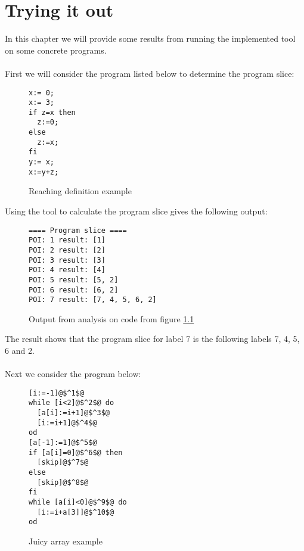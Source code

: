 \chapter{Trying it out}
In this chapter we will provide some results from running the implemented tool on some concrete programs.
\\\\
First we will consider the program listed below to determine the program slice:

\begin{figure}[H]
  \begin{lstlisting}
x:= 0;
x:= 3;
if z=x then 
  z:=0;
else
  z:=x;
fi
y:= x;
x:=y+z;
 \end{lstlisting}
 \caption{Reaching definition example}
\label{code:RD_test_example}
\end{figure}
Using the tool to calculate the program slice gives the following output:

\begin{figure}[H]
  \begin{lstlisting}[numbers=none]
==== Program slice ====
POI: 1 result: [1]
POI: 2 result: [2]
POI: 3 result: [3]
POI: 4 result: [4]
POI: 5 result: [5, 2]
POI: 6 result: [6, 2]
POI: 7 result: [7, 4, 5, 6, 2]
\end{lstlisting}
\caption{Output from analysis on code from figure \ref{code:RD_test_example}}
\label{code:RD_test_example_output}
\end{figure}
The result shows that the program slice for label 7 is the following labels 7, 4, 5, 6 and 2.
\\\\
Next we consider the program below:

\begin{figure}[H]
  \begin{lstlisting}
[i:=-1]@$^1$@
while [i<2]@$^2$@ do
  [a[i]:=i+1]@$^3$@
  [i:=i+1]@$^4$@
od
[a[-1]:=1]@$^5$@
if [a[i]=0]@$^6$@ then
  [skip]@$^7$@
else
  [skip]@$^8$@
fi
while [a[i]<0]@$^9$@ do
  [i:=i+a[3]]@$^10$@
od
 \end{lstlisting}
 \caption{Juicy array example}
\label{code:juicy_array_example}
\end{figure}

